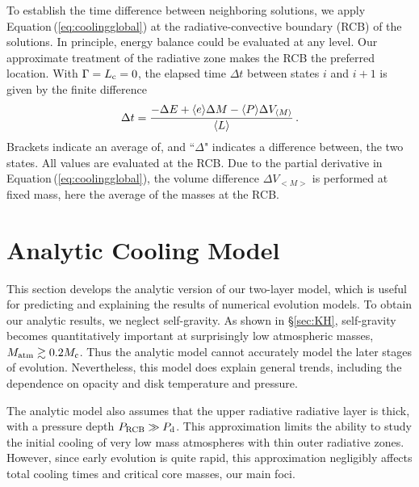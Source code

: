 \documentclass[apj, numberedappendix]{emulateapj}
\newcommand{\brak}[1]{\langle #1\rangle}
\newcommand{\Eq}[1]{Equation\,(\ref{#1})}
\newcommand{\co}{_{\rm c}}
\newcommand{\di}{_{\rm d}}
\newcommand{\cb}{_{\rm RCB}}
\begin{document}
To establish the time difference between neighboring solutions, we apply \Eq{eq:coolingglobal} at the radiative-convective boundary (RCB) of the solutions.  In principle, energy balance could be evaluated at any level.  Our approximate treatment of the radiative zone makes the RCB  the preferred location.   With $\Gamma = L\co = 0$,  the elapsed time $\Delta t$  between states $i$ and $i +1$ is given by the finite difference
\begin{equation}
\label{eq:dti}
\Delta t = %
{ -\Delta E + \brak{e} \Delta M - \brak{P}  \Delta V_{\brak{M}} \over \brak{L} }\, .
\end{equation} 
Brackets indicate an average of, and ``$\Delta$" indicates a difference between, the two states.  All values are evaluated at the RCB.  Due to the partial derivative in \Eq{eq:coolingglobal}, the volume difference $\Delta V_{<M>}$ is performed at fixed mass, here the average of the masses at the RCB.  



\section{Analytic Cooling Model}
\label{sec:coolingan}

This section develops the analytic version of our two-layer model, which is useful for predicting and explaining the results of numerical evolution models.  To obtain our analytic results, we neglect self-gravity.   As shown in  \S\ref{sec:KH}, self-gravity becomes quantitatively important at surprisingly low atmospheric masses, $M_{\rm atm} \gtrsim 0.2 M\co$.  Thus the analytic model cannot accurately model the later stages of evolution.  Nevertheless, this model does explain general trends, including the dependence on opacity and disk temperature and pressure.

The analytic model also assumes that the upper radiative radiative layer is thick, with a pressure depth $P\cb \gg P\di$.  This approximation limits the ability to study the initial cooling of very low mass atmospheres with thin outer radiative zones.  However, since early evolution is quite rapid, this approximation negligibly affects total cooling times and critical core masses, our main foci.
\end{document}
